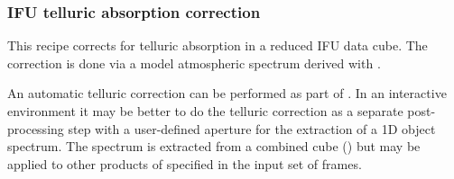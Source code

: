 \clearpage
\subsubsection{IFU telluric absorption correction}
\label{sssec:ifu_tellcorr}
\label{rec:metis_ifu_tellcorr}

This recipe corrects for telluric absorption in a reduced IFU data
cube. The correction is done via a model atmospheric spectrum derived
with .

An automatic telluric correction can be performed as part of
. In an interactive environment it may be
better to do the telluric correction as a separate post-processing
step with a user-defined aperture for the extraction of a 1D object
spectrum. The spectrum is extracted from a combined cube
() but may be applied to other products of
 specified in the input set of frames.

